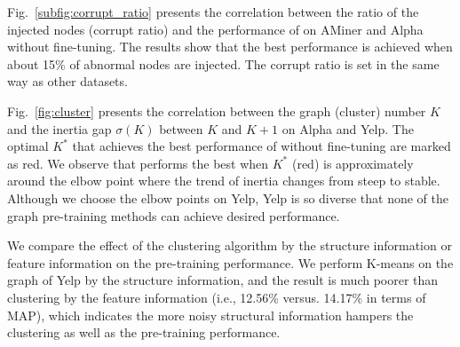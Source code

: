 Fig.~\ref{subfig:corrupt_ratio} presents the correlation between the ratio of the injected nodes (corrupt ratio) and the performance of \spmodel on AMiner and Alpha without fine-tuning. The results show that the best performance is achieved when about 15\% of abnormal nodes are injected. The corrupt ratio is set in the same way as other datasets. 


Fig.~\ref{fig:cluster} presents the correlation between the graph (cluster) number $K$ and the inertia gap $\sigma\left(K\right)$ between $K$ and $K+1$ on Alpha and Yelp. The optimal $K^*$ that achieves the best performance of \spmodel without fine-tuning are marked as red. We observe that \spmodel performs the best when $K^*$ (red) is approximately around the elbow point where the trend of inertia changes from steep to stable. Although we choose the elbow points on Yelp, Yelp is so diverse that none of  the graph pre-training methods can achieve desired performance.

We compare the effect of the clustering algorithm by the structure information or feature information on the pre-training performance. We perform K-means on the graph of Yelp by the structure information, and the result is much poorer than clustering by the feature information (i.e., 12.56\% versus. 14.17\% in terms of MAP), which indicates the more noisy structural information hampers the clustering as well as the pre-training performance. 



